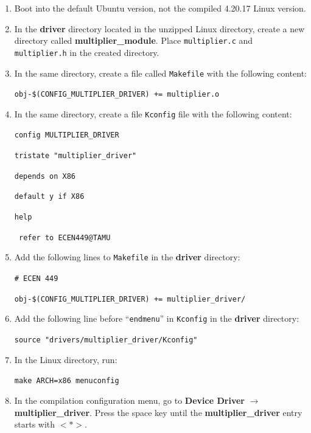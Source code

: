 \documentclass[11pt,letterpaper,titlepage]{article}
\begin{document}
\begin{enumerate}
    
    \item Boot into the default Ubuntu version, not the compiled 4.20.17 Linux version.
    
    \item In the \textbf{driver} directory located in the unzipped Linux directory, create a new directory called \textbf{multiplier\_module}. Place \texttt{multiplier.c} and \texttt{multiplier.h} in the created directory.
    
    \item In the same directory, create a file called \texttt{Makefile} with the following content:
    
    \texttt{obj-\$(CONFIG\_MULTIPLIER\_DRIVER) += multiplier.o}
    
    \item In the same directory, create a file \texttt{Kconfig} file with the following content:
    
    \texttt{config MULTIPLIER\_DRIVER}
    
    \texttt{tristate "multiplier\_driver"}
    
    \texttt{depends on X86}
    
    \texttt{default y if X86}
    
    \texttt{help}
    
    \texttt{ refer to ECEN449@TAMU}
    
    \item Add the following lines to \texttt{Makefile} in the \textbf{driver} directory:
    
    \texttt{\# ECEN 449}
    
    \texttt{obj-\$(CONFIG\_MULTIPLIER\_DRIVER) += multiplier\_driver/}
    
    \item Add the following line before ``\texttt{endmenu}'' in \texttt{Kconfig} in the \textbf{driver} directory:
    
    \texttt{source "drivers/multiplier\_driver/Kconfig"}
    
    \item In the Linux directory, run:
    
    \texttt{make ARCH=x86 menuconfig}
    
    \item In the compilation configuration menu, go to \textbf{Device Driver} $\rightarrow$ \textbf{multiplier\_driver}. Press the space key until the \textbf{multiplier\_driver} entry starts with $<*>$.
    

\end{enumerate}
\end{document}
